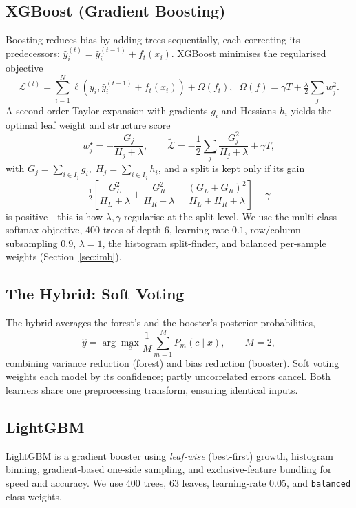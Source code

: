 \documentclass[conference]{IEEEtran}
\begin{document}
\subsection{XGBoost (Gradient Boosting)}
Boosting reduces bias by adding trees sequentially, each correcting its
predecessors: $\hat{y}_i^{(t)}=\hat{y}_i^{(t-1)}+f_t(x_i)$. XGBoost minimises the
regularised objective
\begin{equation}
\mathcal{L}^{(t)}=\sum_{i=1}^{N}\ell\!\left(y_i,\hat{y}_i^{(t-1)}+f_t(x_i)\right)
+\Omega(f_t),\;\;\Omega(f)=\gamma T+\tfrac{\lambda}{2}\sum_j w_j^2 .
\end{equation}
A second-order Taylor expansion with gradients $g_i$ and Hessians $h_i$ yields the
optimal leaf weight and structure score
\begin{equation}
w_j^\star=-\frac{G_j}{H_j+\lambda},\qquad
\tilde{\mathcal{L}}=-\frac{1}{2}\sum_j\frac{G_j^2}{H_j+\lambda}+\gamma T,
\end{equation}
with $G_j=\sum_{i\in I_j}g_i,\;H_j=\sum_{i\in I_j}h_i$, and a split is kept only if
its gain
\begin{equation}
\tfrac{1}{2}\!\left[\frac{G_L^2}{H_L+\lambda}+\frac{G_R^2}{H_R+\lambda}
-\frac{(G_L+G_R)^2}{H_L+H_R+\lambda}\right]-\gamma
\end{equation}
is positive---this is how $\lambda,\gamma$ regularise at the split level. We use
the multi-class softmax objective, $400$ trees of depth $6$, learning-rate
$0.1$, row/column subsampling $0.9$, $\lambda{=}1$, the histogram split-finder, and
balanced per-sample weights (Section~\ref{sec:imb}).

\subsection{The Hybrid: Soft Voting}
The hybrid averages the forest's and the booster's posterior probabilities,
\begin{equation}
\hat{y}=\arg\max_{c}\frac{1}{M}\sum_{m=1}^{M}P_m(c\mid x),\qquad M=2,
\end{equation}
combining variance reduction (forest) and bias reduction (booster). Soft voting
weights each model by its confidence; partly uncorrelated errors cancel. Both
learners share one preprocessing transform, ensuring identical inputs.

\subsection{LightGBM}
LightGBM is a gradient booster using \emph{leaf-wise} (best-first) growth,
histogram binning, gradient-based one-side sampling, and exclusive-feature
bundling for speed and accuracy. We use $400$ trees, $63$ leaves, learning-rate
$0.05$, and \texttt{balanced} class weights.
\end{document}
